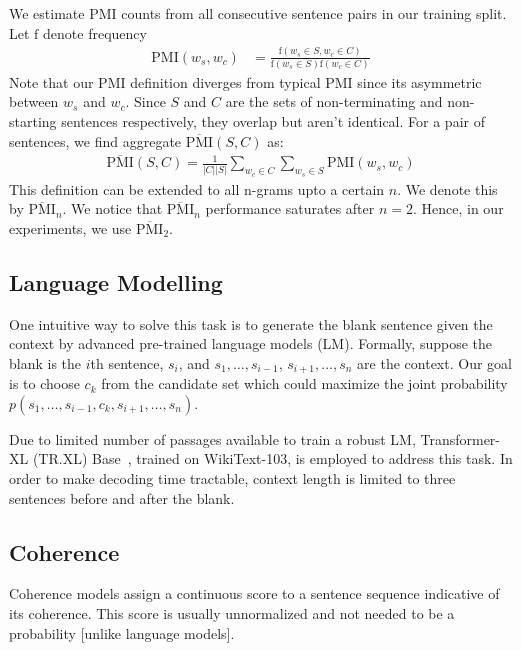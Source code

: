 \documentclass[11pt,a4paper]{article}
\begin{document}
We estimate PMI counts \cite{church1990word} from all consecutive sentence pairs in our training split. Let $\textrm{f}$ denote frequency
\begin{align*}
    \textrm{PMI}(w_{s},w_{c}) &= \frac{\textrm{f}(w_{s} \in S, w_{c} \in C)}{\textrm{f}(w_s \in S)\textrm{f}(w_c \in C)}
\end{align*}
Note that our PMI definition diverges from typical PMI since its asymmetric between $w_s$ and $w_c$. Since $S$ and $C$ are the sets of non-terminating and non-starting sentences respectively, they overlap but aren't identical. For a pair of sentences, we find aggregate $\overline{\textrm{PMI}}(S,C)$ as:
\begin{align*}
    \overline{\textrm{PMI}}(S,C) = \frac{1}{|C||S|} \sum_{w_{c} \in C} \sum_{w_{s} \in S} \textrm{PMI}(w_{s},w_{c})
\end{align*}
This definition can be extended to all n-grams upto a certain $n$. We denote this by $\overline{\textrm{PMI}}_{n}$. We notice that $\overline{\textrm{PMI}}_{n}$ performance saturates after $n=2$. Hence, in our experiments, we use $\overline{\textrm{PMI}}_{2}$. 

\subsection{Language Modelling}
One intuitive way to solve this task is to generate the blank sentence given the context by advanced pre-trained language models (LM). Formally, suppose the blank is the $i$th sentence, $s_{i}$, and $s_{1}, \dots, s_{i-1}$, $s_{i+1}, \dots, s_{n}$ are the context. Our goal is to choose $c_{k}$ from the candidate set which could maximize the joint probability $p(s_{1},\ldots,s_{i-1},c_{k},s_{i+1},\dots, s_{n})$.

Due to limited number of passages available to train a robust LM, Transformer-XL (TR.XL) Base~\cite{dai2019transformer}, trained on WikiText-103, is employed to address this task. In order to make decoding time tractable, context length is limited to three sentences before and after the blank.


\subsection{Coherence}
Coherence models assign a continuous score to a sentence sequence indicative of its coherence. This score is usually unnormalized and not needed to be a probability [unlike language models]. 
\end{document}
